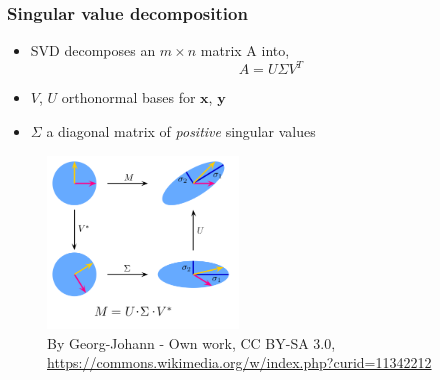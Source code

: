 \documentclass[xcolor={dvipsnames}]{beamer}
\begin{document}
\begin{frame}
\frametitle{Singular value decomposition}
\begin{itemize}
    \item SVD decomposes an $m \times n$ matrix A into,
\begin{equation}
A = U \Sigma V^T
\end{equation}
    \item $V$, $U$ orthonormal bases for $\mathbf{x}$, $\mathbf{y}$
    \item $\Sigma$ a diagonal matrix of \emph{positive} singular values
\end{itemize}
\begin{figure}
\includegraphics[width=2in]{figs/Singular-Value-Decomposition.png}
\caption{By Georg-Johann - Own work, CC BY-SA 3.0, \href{https://commons.wikimedia.org/w/index.php?curid=11342212}{https://commons.wikimedia.org/w/index.php?curid=11342212}}
\end{figure}
\end{frame}
\end{document}
